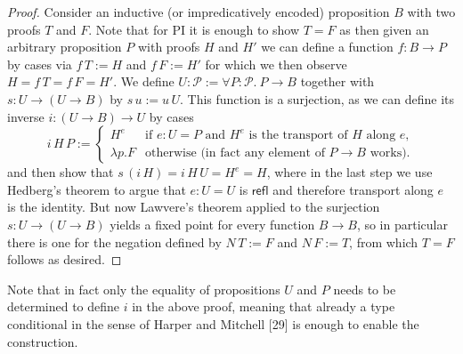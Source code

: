 \begin{proof}
Consider an inductive (or impredicatively encoded) proposition $B$ with two proofs $T$ and $F$.
Note that for PI it is enough to show $T=F$ as then given an arbitrary proposition $P$ with proofs $H$ and $H'$ we can define a function $f:B\to P$ by cases via $f\,T:=H$ and $f\,F:=H'$ for which we then observe $H=f\,T=f\,F=H'$.
We define $U:\mathcal P:=\forall P:\mathcal P.\ P\to B$ together with $s:U\to(U\to B)$ by $s\,u:=u\,U$.
This function is a surjection, as we can define its inverse $i:(U\to B)\to U$ by cases
\[
i\,H\,P:=\begin{cases}
H^e&\text{if }e:U=P\text{ and }H^e\text{ is the transport of }H\text{ along }e,\\
\lambda p.F&\text{otherwise (in fact any element of }P\to B\text{ works)}.
\end{cases}
\]
and then show that $s\,(i\,H)=i\,H\,U=H^e=H$, where in the last step we use Hedberg's theorem to argue that $e:U=U$ is $\mathsf{refl}$ and therefore transport along $e$ is the identity.
But now Lawvere's theorem applied to the surjection $s:U\to(U\to B)$ yields a fixed point for every function $B\to B$, so in particular there is one for the negation defined by $N\,T:=F$ and $N\,F:=T$, from which $T=F$ follows as desired.
\end{proof}
Note that in fact only the equality of propositions $U$ and $P$ needs to be determined to define $i$ in the above proof, meaning that already a type conditional in the sense of Harper and Mitchell [29] is enough to enable the construction.

